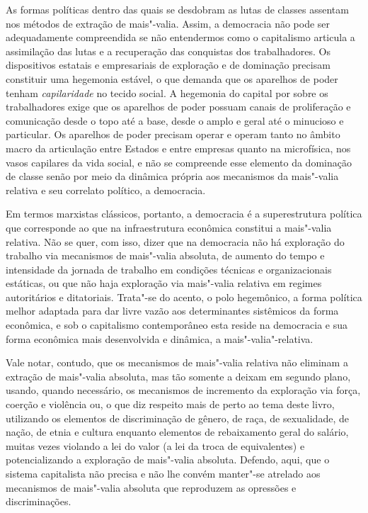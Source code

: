 As formas políticas dentro das quais se desdobram as lutas de classes
assentam nos métodos de extração de mais"-valia. Assim, a democracia não
pode ser adequadamente compreendida se não entendermos como o
capitalismo articula a assimilação das lutas e a recuperação das
conquistas dos trabalhadores. Os dispositivos estatais e empresariais de
exploração e de dominação precisam constituir uma hegemonia estável, o
que demanda que os aparelhos de poder tenham \emph{capilaridade} no
tecido social. A hegemonia do capital por sobre os trabalhadores exige
que os aparelhos de poder possuam canais de proliferação e comunicação
desde o topo até a base, desde o amplo e geral até o minucioso e
particular. Os aparelhos de poder precisam operar e operam tanto no
âmbito macro da articulação entre Estados e entre empresas quanto na
microfísica, nos vasos capilares da vida social, e não se compreende
esse elemento da dominação de classe senão por meio da dinâmica própria
aos mecanismos da mais"-valia relativa e seu correlato político, a
democracia.

Em termos marxistas clássicos, portanto, a democracia é a superestrutura
política que corresponde ao que na infraestrutura econômica constitui a
mais"-valia relativa. Não se quer, com isso, dizer que na democracia não
há exploração do trabalho via mecanismos de mais"-valia absoluta, de
aumento do tempo e intensidade da jornada de trabalho em condições
técnicas e organizacionais estáticas, ou que não haja exploração via
mais"-valia relativa em regimes autoritários e ditatoriais. Trata"-se do
acento, o polo hegemônico, a forma política melhor adaptada para dar
livre vazão aos determinantes sistêmicos da forma econômica, e sob o
capitalismo contemporâneo esta reside na democracia e sua forma
econômica mais desenvolvida e dinâmica, a mais"-valia"-relativa.

Vale notar, contudo, que os mecanismos de mais"-valia relativa não
eliminam a extração de mais"-valia absoluta, mas tão somente a deixam em
segundo plano, usando, quando necessário, os mecanismos de incremento da
exploração via força, coerção e violência ou, o que diz respeito mais de
perto ao tema deste livro, utilizando os elementos de discriminação de
gênero, de raça, de sexualidade, de nação, de etnia e cultura enquanto
elementos de rebaixamento geral do salário, muitas vezes violando a lei
do valor (a lei da troca de equivalentes) e potencializando a exploração
de mais"-valia absoluta. Defendo, aqui, que o sistema capitalista não
precisa e não lhe convém manter"-se atrelado aos mecanismos de mais"-valia
absoluta que reproduzem as opressões e discriminações.

